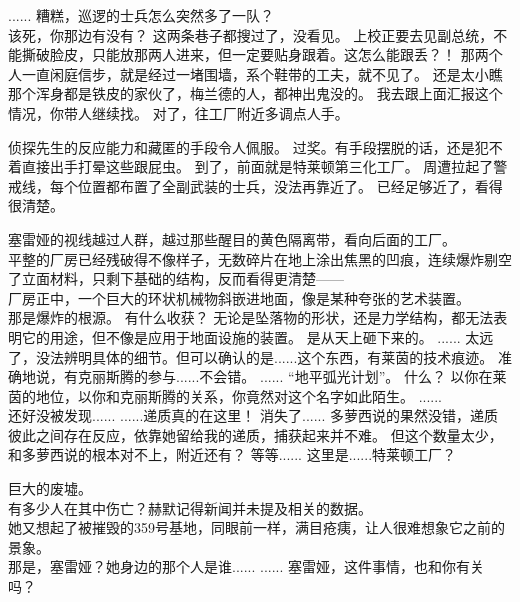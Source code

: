 \documentclass[openany]{book}
\begin{document}
\begin{dialogue}
     ......
     糟糕，巡逻的士兵怎么突然多了一队？
    \\
     该死，你那边有没有？
     这两条巷子都搜过了，没看见。
     上校正要去见副总统，不能撕破脸皮，只能放那两人进来，但一定要贴身跟着。这怎么能跟丢？！
     那两个人一直闲庭信步，就是经过一堵围墙，系个鞋带的工夫，就不见了。
     还是太小瞧那个浑身都是铁皮的家伙了，梅兰德的人，都神出鬼没的。
     我去跟上面汇报这个情况，你带人继续找。
     对了，往工厂附近多调点人手。
\end{dialogue}

\begin{dialogue}
     侦探先生的反应能力和藏匿的手段令人佩服。
     过奖。有手段摆脱的话，还是犯不着直接出手打晕这些跟屁虫。
     到了，前面就是特莱顿第三化工厂。
     周遭拉起了警戒线，每个位置都布置了全副武装的士兵，没法再靠近了。
     已经足够近了，看得很清楚。\par
    塞雷娅的视线越过人群，越过那些醒目的黄色隔离带，看向后面的工厂。\\
    平整的厂房已经残破得不像样子，无数碎片在地上涂出焦黑的凹痕，连续爆炸剔空了立面材料，只剩下基础的结构，反而看得更清楚——\\
    厂房正中，一个巨大的环状机械物斜嵌进地面，像是某种夸张的艺术装置。\\
    那是爆炸的根源。
     有什么收获？
     无论是坠落物的形状，还是力学结构，都无法表明它的用途，但不像是应用于地面设施的装置。
     是从天上砸下来的。
     ......
     太远了，没法辨明具体的细节。但可以确认的是......这个东西，有莱茵的技术痕迹。
     准确地说，有克丽斯腾的参与......不会错。
     ......
     “地平弧光计划”。
     什么？
     以你在莱茵的地位，以你和克丽斯腾的关系，你竟然对这个名字如此陌生。
     ......
    \\
     还好没被发现......
     ......递质真的在这里！
     消失了......
     多萝西说的果然没错，递质彼此之间存在反应，依靠她留给我的递质，捕获起来并不难。
     但这个数量太少，和多萝西说的根本对不上，附近还有？
     等等......
     这里是......特莱顿工厂？\par
    巨大的废墟。\\
    有多少人在其中伤亡？赫默记得新闻并未提及相关的数据。\\
    她又想起了被摧毁的359号基地，同眼前一样，满目疮痍，让人很难想象它之前的景象。\\
     那是，塞雷娅？她身边的那个人是谁......
     ......
     塞雷娅，这件事情，也和你有关吗？
\end{dialogue}
\end{document}
